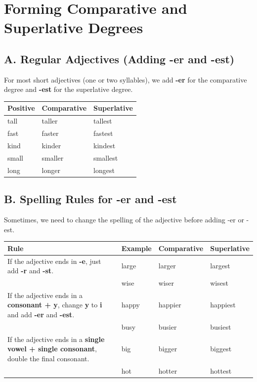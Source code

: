 \section{Forming Comparative and Superlative Degrees}

\subsection*{A. Regular Adjectives (Adding -er and -est)}
For most short adjectives (one or two syllables), we add \textbf{-er} for the comparative degree and \textbf{-est} for the superlative degree.

\begin{table}[h!]
\centering
\begin{tabular}{|l|l|l|}
\hline
\textbf{Positive} & \textbf{Comparative} & \textbf{Superlative} \\
\hline
tall & taller & tallest \\
fast & faster & fastest \\
kind & kinder & kindest \\
small & smaller & smallest \\
long & longer & longest \\
\hline
\end{tabular}
\end{table}

\subsection*{B. Spelling Rules for -er and -est}
Sometimes, we need to change the spelling of the adjective before adding -er or -est.

\begin{table}[h!]
\centering
\begin{tabular}{|p{5cm}|l|l|l|} %
\hline
\textbf{Rule} & \textbf{Example} & \textbf{Comparative} & \textbf{Superlative} \\
\hline
If the adjective ends in \textbf{-e}, just add \textbf{-r} and \textbf{-st}. & large & larger & largest \\
& wise & wiser & wisest \\
\hline
If the adjective ends in a \textbf{consonant + y}, change \textbf{y} to \textbf{i} and add \textbf{-er} and \textbf{-est}. & happy & happier & happiest \\
& busy & busier & busiest \\
\hline
If the adjective ends in a \textbf{single vowel + single consonant}, double the final consonant. & big & bigger & biggest \\
& hot & hotter & hottest \\
\hline
\end{tabular}
\end{table}

